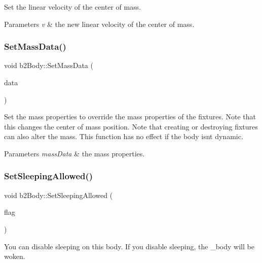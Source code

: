 Set the linear velocity of the center of mass. 
\begin{DoxyParams}{Parameters}
{\em v} & the new linear velocity of the center of mass. \\
\hline
\end{DoxyParams}
\mbox{\label{classb2Body_a58a641fedf8a81e1e26d09ec00a22fe2}} 
\subsubsection{\texorpdfstring{Set\+Mass\+Data()}{SetMassData()}}
{\footnotesize\ttfamily void b2\+Body\+::\+Set\+Mass\+Data (\begin{DoxyParamCaption}\item[{const \mbox{\hyperlink{structb2MassData}{b2\+Mass\+Data}} $\ast$}]{data }\end{DoxyParamCaption})}

Set the mass properties to override the mass properties of the fixtures. Note that this changes the center of mass position. Note that creating or destroying fixtures can also alter the mass. This function has no effect if the body isn\textquotesingle{}t dynamic. 
\begin{DoxyParams}{Parameters}
{\em mass\+Data} & the mass properties. \\
\hline
\end{DoxyParams}
\mbox{\label{classb2Body_a229a6de228416203fecbf7a7544c33bb}} 
\subsubsection{\texorpdfstring{Set\+Sleeping\+Allowed()}{SetSleepingAllowed()}}
{\footnotesize\ttfamily void b2\+Body\+::\+Set\+Sleeping\+Allowed (\begin{DoxyParamCaption}\item[{bool}]{flag }\end{DoxyParamCaption})\hspace{0.3cm}{\ttfamily [inline]}}

You can disable sleeping on this body. If you disable sleeping, the _body will be woken. \mbox{\label{classb2Body_a4686f32bbce5723761e9719c706eca11}}
